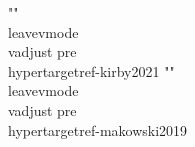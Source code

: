 {{{{{{{{{{{{{{{{{{{{{{{{{{{{""\\leavevmode\\vadjust pre{\\hypertarget{ref-kirby2021}{}}%
""\\leavevmode\\vadjust pre{\\hypertarget{ref-makowski2019}{}}%
}}}}}}}}}}}}}}}}}}}}}}}}}}}}
